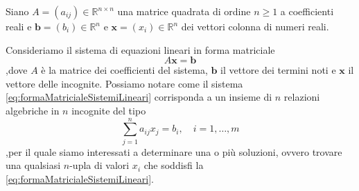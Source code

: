 \nocite{Quarteroni2000}
\nocite{Quarteroni1997}
Siano $A=(a_{ij})\in\mathbb{R}^{n\times n}$ una matrice quadrata di ordine $n\ge1$ a coefficienti reali e $\bm{b}=(b_{i})\in\mathbb{R}^{n}$ e $\bm{x}=(x_{i})\in\mathbb{R}^{n}$ dei vettori colonna di numeri reali.

Consideriamo il sistema di equazioni lineari in forma matriciale
\begin{equation}
\label{eq:formaMatricialeSistemiLineari}
A\bm{x}=\bm{b}
\end{equation}
,dove $A$ \`e la matrice dei coefficienti del sistema, $\bm{b}$ il vettore dei termini noti e $\bm{x}$ il vettore delle incognite.\newline
Possiamo notare come il sistema \eqref{eq:formaMatricialeSistemiLineari} corrisponda a un insieme di $n$ relazioni algebriche in $n$ incognite del tipo
\begin{equation}
\label{eq:formaAlgebricaSistemiLineari}
\sum_{j=1}^{n}a_{ij}x_{j}=b_{i},\quad i = 1, \dots, m
\end{equation}
,per il quale siamo interessati a determinare una o pi\`u soluzioni, ovvero trovare una qualsiasi $n$-upla di valori $x_{i}$ che soddisfi la \eqref{eq:formaMatricialeSistemiLineari}.
